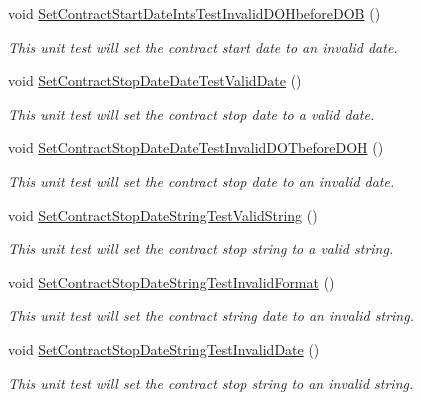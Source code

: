 \begin{DoxyCompactItemize}
void \hyperlink{class_my_all_employee_1_1_tests_1_1_contract_employee_tests_acecbb0788b2c0d2976aac21e06be62ee}{Set\+Contract\+Start\+Date\+Ints\+Test\+Invalid\+D\+O\+Hbefore\+D\+O\+B} ()
\begin{DoxyCompactList}\small\item\em This unit test will set the contract start date to an invalid date. \end{DoxyCompactList}\item 
void \hyperlink{class_my_all_employee_1_1_tests_1_1_contract_employee_tests_a29d11eaee911de4b54569f10f7c1702d}{Set\+Contract\+Stop\+Date\+Date\+Test\+Valid\+Date} ()
\begin{DoxyCompactList}\small\item\em This unit test will set the contract stop date to a valid date. \end{DoxyCompactList}\item 
void \hyperlink{class_my_all_employee_1_1_tests_1_1_contract_employee_tests_a353fe82d85914fe0d217d4668843df81}{Set\+Contract\+Stop\+Date\+Date\+Test\+Invalid\+D\+O\+Tbefore\+D\+O\+H} ()
\begin{DoxyCompactList}\small\item\em This unit test will set the contract stop date to an invalid date. \end{DoxyCompactList}\item 
void \hyperlink{class_my_all_employee_1_1_tests_1_1_contract_employee_tests_a0ed7d04ddfb7e0aaf1e6b4bf371c6b65}{Set\+Contract\+Stop\+Date\+String\+Test\+Valid\+String} ()
\begin{DoxyCompactList}\small\item\em This unit test will set the contract stop string to a valid string. \end{DoxyCompactList}\item 
void \hyperlink{class_my_all_employee_1_1_tests_1_1_contract_employee_tests_a261ee3cc3d3da92b06acdffbe32eb408}{Set\+Contract\+Stop\+Date\+String\+Test\+Invalid\+Format} ()
\begin{DoxyCompactList}\small\item\em This unit test will set the contract string date to an invalid string. \end{DoxyCompactList}\item 
void \hyperlink{class_my_all_employee_1_1_tests_1_1_contract_employee_tests_a9b30804b1769d8276ba81b1bf10f4f4b}{Set\+Contract\+Stop\+Date\+String\+Test\+Invalid\+Date} ()
\begin{DoxyCompactList}\small\item\em This unit test will set the contract stop string to an invalid string. \end{DoxyCompactList}\item 

\end{DoxyCompactItemize}
